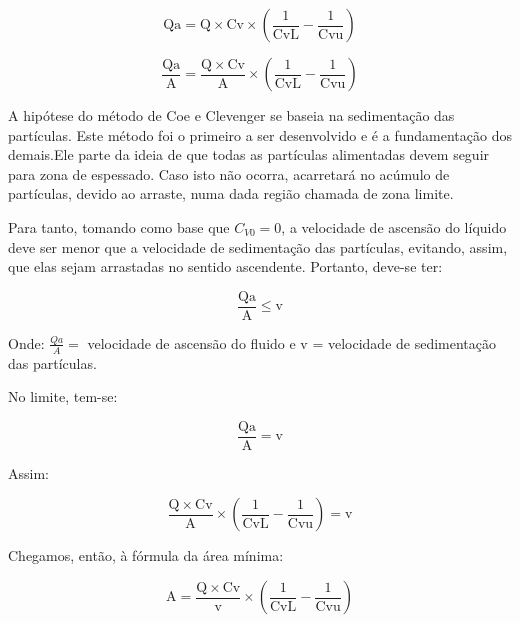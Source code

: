 \begin{equation}\label{key}
\mathrm{Qa}=\mathrm{Q} \times \mathrm{Cv} \times\left(\frac{1}{\mathrm{CvL}}-\frac{1}{\mathrm{Cvu}}\right)
\end{equation}

\begin{equation}\label{key}
\frac{\mathrm{Qa}}{\mathrm{A}}=\frac{\mathrm{Q} \times \mathrm{Cv}}{\mathrm{A}} \times\left(\frac{1}{\mathrm{CvL}}-\frac{1}{\mathrm{Cvu}}\right)
\end{equation}

A hipótese do método de Coe e Clevenger se baseia na sedimentação das partículas. Este método foi o primeiro a ser desenvolvido e é a fundamentação dos demais.Ele parte da ideia de que todas as partículas alimentadas devem seguir para zona de espessado. Caso isto não ocorra, acarretará no acúmulo de partículas, devido ao arraste, numa dada região chamada de zona limite.

Para tanto, tomando como base que $ C_{V0} = 0 $, a velocidade de ascensão do líquido deve ser menor que a velocidade de sedimentação das partículas, evitando, assim, que elas sejam arrastadas no sentido ascendente. Portanto, deve-se ter:



\begin{equation}\label{key}
\frac{\mathrm{Qa}}{\mathrm{A}} \leq \mathrm{v}
\end{equation}

Onde: $ \frac{Qa}{A} = $ velocidade de ascensão do fluido e v = velocidade de sedimentação das partículas.

No limite, tem-se:

\begin{equation}\label{key}
\frac{\mathrm{Qa}}{\mathrm{A}}=\mathrm{v}
\end{equation}

Assim:

\begin{equation}\label{key}
\frac{\mathrm{Q} \times \mathrm{Cv}}{\mathrm{A}} \times\left(\frac{1}{\mathrm{CvL}}-\frac{1}{\mathrm{Cvu}}\right)=\mathrm{v}
\end{equation}

Chegamos, então, à fórmula da área mínima:

\begin{equation}\label{key}
\mathrm{A}=\frac{\mathrm{Q} \times \mathrm{C} \mathrm{v}}{\mathrm{v}} \times\left(\frac{\mathrm{1}}{\mathrm{C} \mathrm{v} \mathrm{L}}-\frac{\mathrm{1}}{\mathrm{C} \mathrm{v} \mathrm{u}}\right)
\end{equation}


